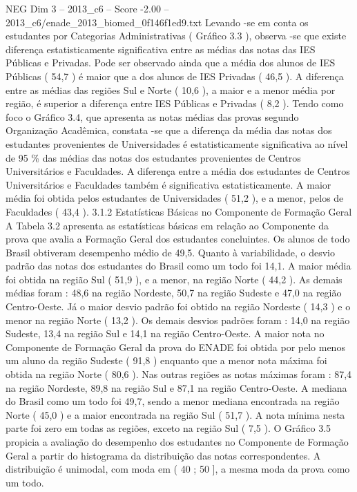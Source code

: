 \begin{textsample}{NEG Dim 3 – 2013\_c6 – Score -2.00 – 2013\_c6/enade\_2013\_biomed\_0f146f1ed9.txt}
Levando -se em conta os estudantes por Categorias Administrativas ( Gráfico 3.3 ), observa -se que existe diferença estatisticamente significativa entre as médias das notas das IES Públicas e Privadas.
Pode ser observado ainda que a média dos alunos de IES Públicas ( 54,7 ) é maior que a dos alunos de IES Privadas ( 46,5 ).
A diferença entre as médias das regiões Sul e Norte ( 10,6 ), a maior e a menor média por região, é superior a diferença entre IES Públicas e Privadas ( 8,2 ).
Tendo como foco o Gráfico 3.4, que apresenta as notas médias das provas segundo Organização Acadêmica, constata -se que a diferença da média das notas dos estudantes provenientes de Universidades é estatisticamente significativa ao nível de 95 \% das médias das notas dos estudantes provenientes de Centros Universitários e Faculdades.
A diferença entre a média dos estudantes de Centros Universitários e Faculdades também é significativa estatisticamente.
A maior média foi obtida pelos estudantes de Universidades ( 51,2 ), e a menor, pelos de Faculdades ( 43,4 ). 3.1.2 Estatísticas Básicas no Componente de Formação Geral A Tabela 3.2 apresenta as estatísticas básicas em relação ao Componente da prova que avalia a Formação Geral dos estudantes concluintes.
Os alunos de todo Brasil obtiveram desempenho médio de 49,5.
Quanto à variabilidade, o desvio padrão das notas dos estudantes do Brasil como um todo foi 14,1.
A maior média foi obtida na região Sul ( 51,9 ), e a menor, na região Norte ( 44,2 ).
As demais médias foram : 48,6 na região Nordeste, 50,7 na região Sudeste e 47,0 na região Centro-Oeste.
Já o maior desvio padrão foi obtido na região Nordeste ( 14,3 ) e o menor na região Norte ( 13,2 ).
Os demais desvios padrões foram : 14,0 na região Sudeste, 13,4 na região Sul e 14,1 na região Centro-Oeste.
A maior nota no Componente de Formação Geral da prova do ENADE foi obtida por pelo menos um aluno da região Sudeste ( 91,8 ) enquanto que a menor nota máxima foi obtida na região Norte ( 80,6 ).
Nas outras regiões as notas máximas foram : 87,4 na região Nordeste, 89,8 na região Sul e 87,1 na região Centro-Oeste.
A mediana do Brasil como um todo foi 49,7, sendo a menor mediana encontrada na região Norte ( 45,0 ) e a maior encontrada na região Sul ( 51,7 ).
A nota mínima nesta parte foi zero em todas as regiões, exceto na região Sul ( 7,5 ).
O Gráfico 3.5 propicia a avaliação do desempenho dos estudantes no Componente de Formação Geral a partir do histograma da distribuição das notas correspondentes.
A distribuição é unimodal, com moda em ( 40 ; 50 ], a mesma moda da prova como um todo.

\end{textsample}
